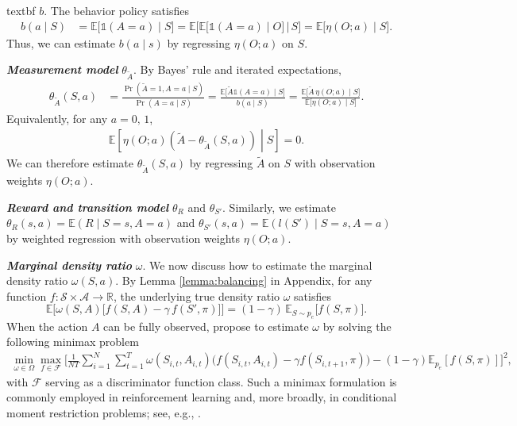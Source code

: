 \documentclass[12pt]{article}
\newcommand{\0}{\boldsymbol{0}}
\newcommand{\E}{\mathbb{E}}
\begin{document}
\csname textbf $b$. The behavior policy satisfies
\begin{align*}
 b(a\mid S)
 &=\E\big[\mathds{1}(A=a)\mid S\big]
 =\E\Big[\E\big[\mathds{1}(A=a)\mid O\big] \,\Big|\,S\Big]
 =\E\big[\eta(O;a)\mid S\big].
\end{align*}
Thus, we can estimate $b(a\mid s)$ by regressing $\eta(O;a)$ on $S$.

\textit{\textbf{Measurement model}} $\theta_{\widetilde A}$. 
By Bayes' rule and iterated expectations,
\begin{align*}
\theta_{\widetilde A}(S,a)
&=\frac{\Pr(\widetilde A=1, A=a\mid S)}{\Pr(A=a\mid S)}
=\frac{\E\big[\widetilde A\mathds{1}(A=a)\mid S\big]}{b(a\mid S)}
=\frac{\E\big[\widetilde A\,\eta(O;a)\mid S\big]}{\E\big[\eta(O;a)\mid S\big]}.
\end{align*}
Equivalently, for any $a=0,\,1$,
\begin{gather*}
\E\left[ \eta(O;a)\left(\widetilde A-\theta_{\widetilde A}(S,a)\right) \middle| S \right]=0.
\end{gather*}
We can therefore estimate $\theta_{\widetilde A}(S,a)$ by regressing $\widetilde A$ on $S$ with observation weights $\eta(O;a)$.

\textit{\textbf{Reward and transition model}} $\theta_R$ and $\theta_{S'}$. Similarly, we estimate
$\theta_R(s,a)=\E(R\mid S=s,A=a)$ and
$\theta_{S'}(s,a)=\E(l(S')\mid S=s,A=a)$
by weighted regression with observation weights $\eta(O;a)$.






\textbf{\textit{Marginal density ratio}} $\omega$.
We now discuss how to estimate the marginal density ratio $\omega(S,a)$.
By Lemma \ref{lemma:balancing} in Appendix, for any function $f:\mathcal S\times\mathcal A\to\mathbb R$, the underlying true density ratio $\omega$ satisfies
\begin{equation}
\E\Big[
\omega(S,A)
\big[
f(S,A) - \gamma \, f(S',\pi)
\big]
\Big]
=
(1-\gamma)\,\mathbb E_{S\sim p_e}\Big[f(S,\pi)\Big].
\label{eq:balance}
\end{equation}
When the action $A$ can be fully observed, \citet{uehara2020minimax} propose to
estimate $\omega$ by solving the following minimax problem
\begin{align*}
\min_{\omega \in \Omega} \max_{f \in \mathcal{F}}
\Bigg[
\frac{1}{NT}\sum_{i=1}^N\sum_{t=1}^T 
\omega(S_{i,t},A_{i,t})
\Big(
f(S_{i,t},A_{i,t})
-
\gamma f(S_{i,t+1},\pi)
\Big)
-(1-\gamma)\E_{p_e}[f(S,\pi)]
\Bigg]^2,
\end{align*} with $\mathcal{F}$ serving as a discriminator function class. Such a minimax formulation is commonly employed in reinforcement learning and, more broadly, in conditional moment restriction problems; see, e.g., \citet{liu2018breaking,dikkala2020minimax,shi2021deeply}.
\end{document}
